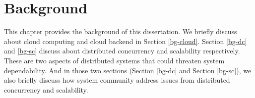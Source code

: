 \chapter{Background}
\label{chp-bg}

This chapter provides the background of this dissertation. We briefly discuss
about cloud computing and cloud backend in Section \ref{bg-cloud}. Section
\ref{bg-dc} and \ref{bg-sc} discuss about distributed concurrency and
scalability respectively. These are two aspects of distributed systems that
could threaten system dependability. And in those two sections (Section
\ref{bg-dc} and Section \ref{bg-sc}), we also briefly discuss how system
community address issues from distributed concurrency and scalability.
%



%


